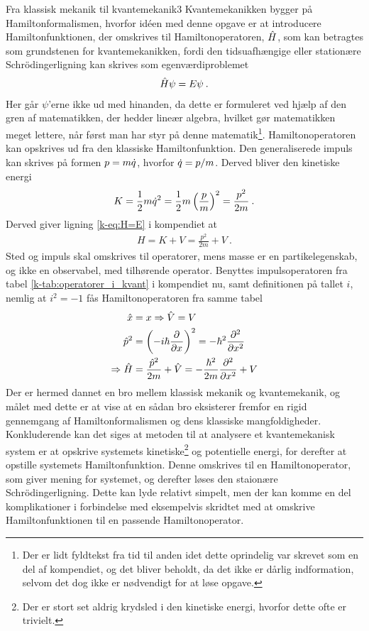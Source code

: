 \begin{opgave}{Fra klassisk mekanik til kvantemekanik}{3}
Kvantemekanikken bygger på Hamiltonformalismen, hvorfor idéen med denne opgave er at introducere Hamiltonfunktionen, der omskrives til Hamiltonoperatoren, $\op{H}$, som kan betragtes som grundstenen for kvantemekanikken, fordi den tidsuafhængige eller stationære Schrödingerligning kan skrives som egenværdiproblemet
\begin{align}
	\op{H}\psi = E\psi \: .
\end{align}
Her går $\psi$'erne ikke ud med hinanden, da dette er formuleret ved hjælp af den gren af matematikken, der hedder lineær algebra, hvilket gør matematikken meget lettere, når først man har styr på denne matematik\footnote{Der er lidt fyldtekst fra tid til anden idet dette oprindelig var skrevet som en del af kompendiet, og det bliver beholdt, da det ikke er dårlig indformation, selvom det dog ikke er nødvendigt for at løse opgave.}. Hamiltonoperatoren kan opskrives ud fra den klassiske Hamiltonfunktion.
\opg Den generaliserede impuls kan skrives på formen $p = m\dt{q}$, hvorfor $\dt{q} = p/m$. Derved bliver den kinetiske energi
\begin{align} \label{eq:K(p)}
	K = \frac{1}{2}m\dt{q}^2 = \frac{1}{2}m\left(\frac{p}{m}\right)^2 = \frac{p^2}{2m} \: .
\end{align}
\opg Derved giver ligning \eqref{k-eq:H=E} i kompendiet at
\begin{align}
	H = K + V = \frac{p^2}{2m} + V \: .
\end{align}
\opg Sted og impuls skal omskrives til operatorer, mens masse er en partikelegenskab, og ikke en observabel, med tilhørende operator.
\opg Benyttes impulsoperatoren fra tabel \ref{k-tab:operatorer_i_kvant} i kompendiet nu, samt definitionen på tallet $i$, nemlig at $i^2 = -1$ fås Hamiltonoperatoren fra samme tabel
\begin{align}
	\op{x} &= x \Rightarrow \op{V} = V \\
	\op{p}^2 &= \left(-i\hbar\pdif{x}{}\right)^2 = -\hbar^2\pdif[2]{x}{} \\
	\Rightarrow \op{H} &= \frac{\op{p}^2}{2m} + \op{V} = -\frac{\hbar^2}{2m}\pdif[2]{x}{} + V
\end{align}
Der er hermed dannet en bro mellem klassisk mekanik og kvantemekanik, og målet med dette er at vise at en sådan bro eksisterer fremfor en rigid gennemgang af Hamiltonformalismen og dens klassiske mangfoldigheder. \\

Konkluderende kan det siges at metoden til at analysere et kvantemekanisk system er at opskrive systemets kinetiske\footnote{Der er stort set aldrig krydsled i den kinetiske energi, hvorfor dette ofte er trivielt.} og potentielle energi, for derefter at opstille systemets Hamiltonfunktion. Denne omskrives til en Hamiltonoperator, som giver mening for systemet, og derefter løses den staionære Schrödingerligning. Dette kan lyde relativt simpelt, men der kan komme en del komplikationer i forbindelse med eksempelvis skridtet med at omskrive Hamiltonfunktionen til en passende Hamiltonoperator.
\end{opgave}
